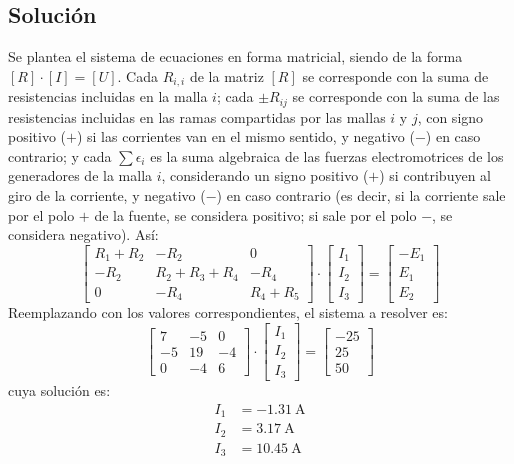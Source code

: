   \subsection*{Solución}
  Se plantea el sistema de ecuaciones en forma matricial, siendo de la forma $[R]\cdot[I]=[U]$. Cada $R_{i,i}$ de la matriz $[R]$ se corresponde con la suma de resistencias incluidas en la malla $i$; cada $\pm R_{ij}$ se corresponde con la suma de las resistencias incluidas en las ramas compartidas por las mallas $i$ y $j$, con signo positivo ($+$) si las corrientes van en el mismo sentido, y negativo ($-$) en caso contrario; y cada $\sum \epsilon_i$ es la suma algebraica de las fuerzas electromotrices de los generadores de la malla $i$, considerando un signo positivo ($+$) si contribuyen al giro de la corriente, y negativo ($-$) en caso contrario (es decir, si la corriente sale por el polo $+$ de la fuente, se considera positivo; si sale por el polo $-$, se considera negativo). Así:
  \begin{equation*}
    \begin{bmatrix}
      R_1+R_2 & -R_2 & 0 \\
      -R_2 & R_2+R_3+R_4 & -R_4 \\
      0 & -R_4 & R_4+R_5
    \end{bmatrix} \cdot
    \begin{bmatrix}
      I_1\\
      I_2\\
      I_3
    \end{bmatrix} = %
    \begin{bmatrix}
      -E_1 \\
      E_1\\
      E_2
    \end{bmatrix}
  \end{equation*}
  Reemplazando con los valores correspondientes, el sistema a resolver es:
  \begin{equation*}
    \begin{bmatrix}
      7 & -5 & 0 \\
      -5 & 19 & -4 \\
      0 & -4 & 6
    \end{bmatrix} \cdot
    \begin{bmatrix}
      I_1\\
      I_2\\
      I_3
    \end{bmatrix} = %
    \begin{bmatrix}
      -25 \\
      25\\
      50
    \end{bmatrix}
  \end{equation*}
  cuya solución es:
  \begin{align*}
    I_1&=\qty{-1.31}{\ampere}\\
    I_2&=\qty{3.17}{\ampere}\\
    I_3&=\qty{10.45}{\ampere}
  \end{align*}


